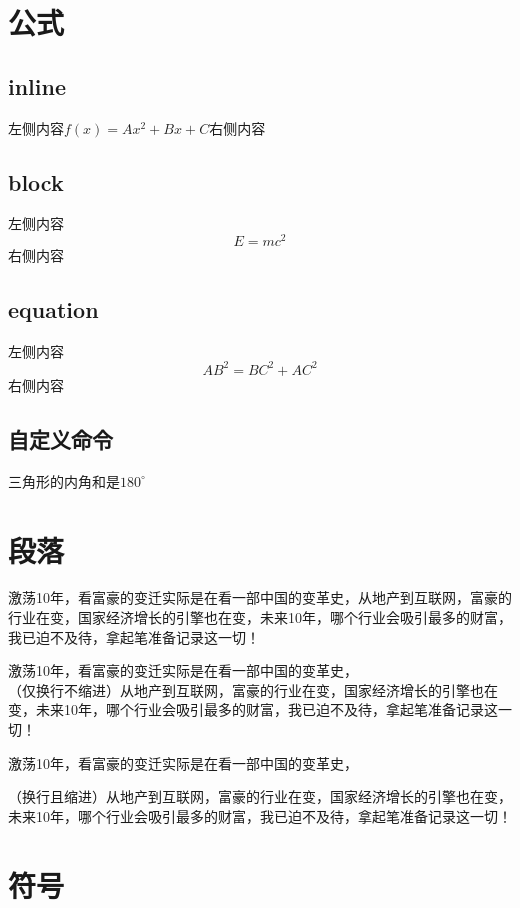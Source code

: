 \documentclass[UTF8]{ctexart}
\newcommand{\degree}{^\circ}
\begin{document}
    \section{公式}

    \subsection{inline}

    左侧内容$f(x)=Ax^2+Bx+C$右侧内容

    \subsection{block}

    左侧内容$$E=mc^2$$右侧内容

    \subsection{equation}

    左侧内容\begin{equation}
        AB^2=BC^2+AC^2
    \end{equation}右侧内容

    \subsection{自定义命令}

    三角形的内角和是$180\degree$

    \section{段落}

    激荡10年，看富豪的变迁实际是在看一部中国的变革史，从地产到互联网，富豪的行业在变，国家经济增长的引擎也在变，未来10年，哪个行业会吸引最多的财富，我已迫不及待，拿起笔准备记录这一切！

    激荡10年，看富豪的变迁实际是在看一部中国的变革史，\\（仅换行不缩进）从地产到互联网，富豪的行业在变，国家经济增长的引擎也在变，未来10年，哪个行业会吸引最多的财富，我已迫不及待，拿起笔准备记录这一切！

    激荡10年，看富豪的变迁实际是在看一部中国的变革史，\par （换行且缩进）从地产到互联网，富豪的行业在变，国家经济增长的引擎也在变，未来10年，哪个行业会吸引最多的财富，我已迫不及待，拿起笔准备记录这一切！

    \section{符号}
\end{document}

